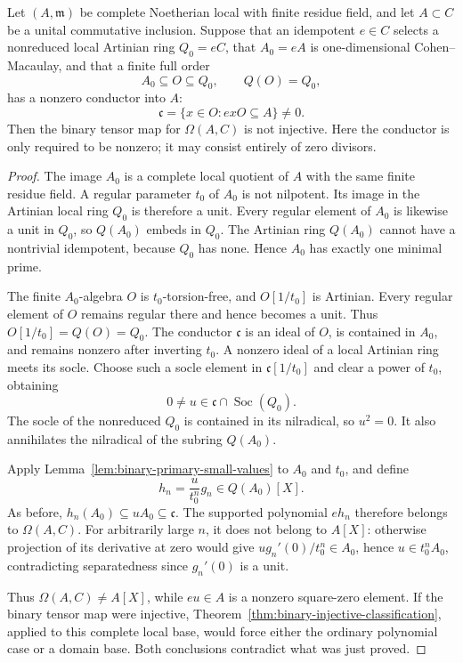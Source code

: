\begin{corollary}
\label{cor:binary-selected-nonzero-conductor}
Let $(A,\mathfrak m)$ be complete Noetherian local with finite
residue field, and let $A\subset C$ be a unital commutative
inclusion.  Suppose that an idempotent $e\in C$ selects a
nonreduced local Artinian ring $Q_0=eC$, that $A_0=eA$ is
one-dimensional Cohen--Macaulay, and that a finite full order
\[
 A_0\subseteq O\subseteq Q_0,\qquad Q(O)=Q_0,
\]
has a nonzero conductor into $A$:
\[
 \mathfrak c=\{x\in O:e xO\subseteq A\}\ne0.
\]
Then the binary tensor map for $\Omega(A,C)$ is not injective.
Here the conductor is only required to be nonzero; it may
consist entirely of zero divisors.
\end{corollary}
\begin{proof}
The image $A_0$ is a complete local quotient of $A$ with the
same finite residue field.  A regular parameter $t_0$ of $A_0$
is not nilpotent.  Its image in the Artinian local ring $Q_0$
is therefore a unit.  Every regular element of $A_0$ is likewise
a unit in $Q_0$, so $Q(A_0)$ embeds in $Q_0$.
The Artinian ring $Q(A_0)$ cannot have a nontrivial idempotent,
because $Q_0$ has none.  Hence $A_0$ has exactly one minimal
prime.

The finite $A_0$-algebra $O$ is $t_0$-torsion-free, and
$O[1/t_0]$ is Artinian.  Every regular element of $O$ remains
regular there and hence becomes a unit.  Thus
$O[1/t_0]=Q(O)=Q_0$.
The conductor $\mathfrak c$ is an ideal of $O$, is contained
in $A_0$, and remains nonzero after inverting $t_0$.
A nonzero ideal of a local Artinian ring meets its socle.
Choose such a socle element in $\mathfrak c[1/t_0]$ and clear
a power of $t_0$, obtaining
\[
 0\ne u\in\mathfrak c\cap\operatorname{Soc}(Q_0).
\]
The socle of the nonreduced $Q_0$ is contained in its nilradical,
so $u^2=0$.  It also annihilates the nilradical of the subring
$Q(A_0)$.

Apply Lemma~\ref{lem:binary-primary-small-values} to $A_0$ and
$t_0$, and define
\[
 h_n=\frac{u}{t_0^n}g_n\in Q(A_0)[X].
\]
As before, $h_n(A_0)\subseteq uA_0\subseteq\mathfrak c$.
The supported polynomial $e h_n$ therefore belongs to
$\Omega(A,C)$.  For arbitrarily large $n$, it does not belong
to $A[X]$: otherwise projection of its derivative at zero
would give
$u g_n'(0)/t_0^n\in A_0$, hence
$u\in t_0^nA_0$, contradicting separatedness since $g_n'(0)$
is a unit.

Thus $\Omega(A,C)\ne A[X]$, while $eu\in A$ is a nonzero
square-zero element.  If the binary tensor map were injective,
Theorem~\ref{thm:binary-injective-classification}, applied to
this complete local base, would force either the ordinary
polynomial case or a domain base.  Both conclusions contradict
what was just proved.
\end{proof}
